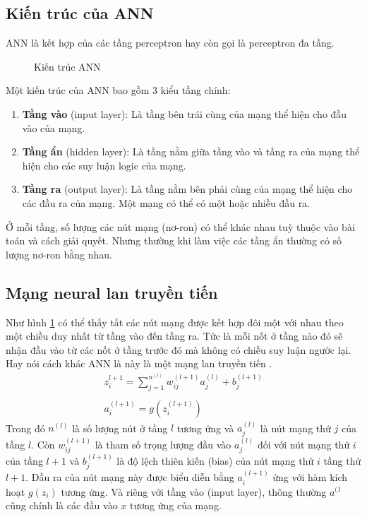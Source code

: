     \subsection{Kiến trúc của ANN}
    ANN là kết hợp của các tầng perceptron hay còn gọi là perceptron đa tầng. 
    \begin{figure}[ht]
        \centering
        \caption{Kiến trúc ANN}
        \label{fig:problem:neural-architect}
    \end{figure}
    Một kiến trúc của ANN bao gồm 3 kiểu tầng chính:
    \begin{enumerate}
        \item \textbf{Tầng vào} (input layer): Là tầng bên trái cùng của mạng thể hiện cho đầu vào của mạng.
        \item \textbf{Tầng ẩn} (hidden layer): Là tầng nằm giữa tầng vào và tầng ra của mạng thể hiện cho các suy luận logic của mạng.
        \item \textbf{Tầng ra} (output layer): Là tầng nằm bên phải cùng của mạng thể hiện cho các đầu ra của mạng. Một mạng có thể có một hoặc nhiều đầu ra.
    \end{enumerate}
    Ở mỗi tầng, số lượng các nút mạng (nơ-ron) có thể khác nhau tuỳ thuộc vào bài toán và cách giải quyết. Nhưng thường khi làm việc các tầng ẩn thường có số lượng nơ-ron bằng nhau. 
    \subsection{Mạng neural lan truyền tiến}
    Như hình \ref{fig:problem:neural-architect} có thể thấy tất các nút mạng được kết hợp đôi một với nhau theo một chiều duy nhất từ tầng vào đến tầng ra. Tức là mỗi nốt ở tầng nào đó sẽ nhận đầu vào từ các nốt ở tầng trước đó mà không có chiều suy luận ngước lại. Hay nói cách khác ANN là này là một mạng lan truyền tiến \cite{fine2006feedforward}. 
    \begin{equation}
      \begin{array}{l}
        z_i^{l+1} = \sum_{j=1}^{n^{(l)}}w_{ij}^{(l+1)}a_j^{(l)} + b_j^{(l+1)} \\
        \\
        a_i^{(l+1)} = g(z_i^{(l+1)})
      \end{array}
    \end{equation}
    Trong đó $n^{(l)}$ là số lượng nút ở tầng $l$ tương ứng và $a_j^{(l)}$ là nút mạng thứ $j$ của tầng $l$. Còn $w_{ij}^{(l+1)}$ là tham số trọng lượng đầu vào $a_j^{(l)}$ đối với nút mạng thứ $i$ của tầng $l+1$ và $b_j^{(l+1)}$ là độ lệch thiên kiến (bias) của nút mạng thứ $i$ tầng thứ $l+1$. Đầu ra của nút mạng này được biểu diễn bằng $a_i^{(l+1)}$ ứng với hàm kích hoạt $g(z_i)$ tương ứng. Và riêng với tầng vào (input layer), thông thường $a^{(1}$ cũng chính là các đầu vào $x$ tương ứng của mạng. 
